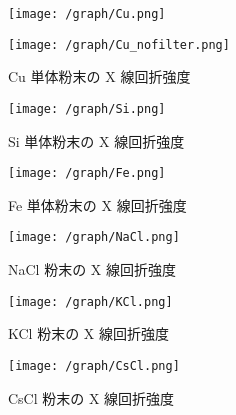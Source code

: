 \documentclass[11pt,dvipdfmx,a4paper]{jsarticle}
\begin{document}
\begin{figure}[H]
	\centering
	\begin{minipage}[t]{0.48\columnwidth}
		\centering
		\texttt{[image: /graph/Cu.png]}
	\end{minipage}
	\hfil
	\begin{minipage}[t]{0.48\columnwidth}
		\centering
		\texttt{[image: /graph/Cu\_nofilter.png]}
	\end{minipage}
	\caption{Cu 単体粉末の X 線回折強度}
	\label{Cu_XRD}
\end{figure}
\begin{figure}[H]
	\centering
	\begin{minipage}[t]{0.48\columnwidth}
		\centering
		\texttt{[image: /graph/Si.png]}
		\caption{Si 単体粉末の X 線回折強度}
		\label{Si_XRD}
	\end{minipage}
	\hfil
	\begin{minipage}[t]{0.48\columnwidth}
		\centering
		\texttt{[image: /graph/Fe.png]}
		\caption{Fe 単体粉末の X 線回折強度}
		\label{Fe_XRD}
	\end{minipage}
\end{figure}
\begin{figure}[H]
	\centering
	\begin{minipage}[t]{0.48\columnwidth}
		\centering
		\texttt{[image: /graph/NaCl.png]}
		\caption{NaCl 粉末の X 線回折強度}
		\label{NaCl_XRD}
	\end{minipage}
	\hfil
	\begin{minipage}[t]{0.48\columnwidth}
		\centering
		\texttt{[image: /graph/KCl.png]}
		\caption{KCl 粉末の X 線回折強度}
		\label{KCl_XRD}
	\end{minipage}
\end{figure}
\begin{figure}[H]
	\centering
	\begin{minipage}[t]{0.48\columnwidth}
		\centering
		\texttt{[image: /graph/CsCl.png]}
		\caption{CsCl 粉末の X 線回折強度}
		\label{CsCl_XRD}
	\end{minipage}
\end{figure}
\end{document}
